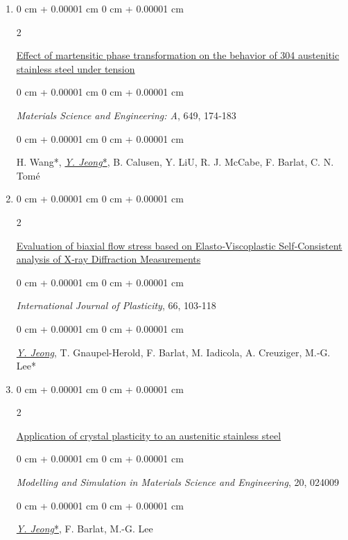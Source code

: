 \documentclass[10pt, letterpaper]{article}
\newenvironment{onecolentry}{
    \begin{adjustwidth}{
        0 cm + 0.00001 cm
    }{
        0 cm + 0.00001 cm
    }
}{
    \end{adjustwidth}
} %
\newenvironment{twocolentry}[2][]{
    \onecolentry
    \def\secondColumn{#2}
    \setcolumnwidth{\fill, 4.5 cm}
    \begin{paracol}{2}
}{
    \switchcolumn \raggedleft \secondColumn
    \end{paracol}
    \endonecolentry
} %
\begin{document}
\begin{enumerate}
        \item
        \begin{twocolentry}{2016}
            \href{http://dx.doi.org/10.1016/j.msea.2015.09.108}{Effect of martensitic phase transformation on the behavior of 304 austenitic stainless steel under tension}
        \end{twocolentry}
        \begin{onecolentry}
            {\it Materials Science and Engineering: A}, 649, 174‑183
        \end{onecolentry}
        \begin{onecolentry}
            H. Wang*, {\underline{\textit{Y. Jeong}*}}, B. Calusen, Y. LiU, R. J. McCabe, F. Barlat, C. N. Tomé
        \end{onecolentry}
        \vspace{0.10 cm}



        \item
        \begin{twocolentry}{2015}
            \href{http://dx.doi.org/10.1016/j.ijplas.2014.06.009}{Evaluation of biaxial flow stress based on Elasto‑Viscoplastic Self‑Consistent analysis of X‑ray Diffraction Measurements}
        \end{twocolentry}
        \begin{onecolentry}
            {\it International Journal of Plasticity}, 66, 103‑118
        \end{onecolentry}
        \begin{onecolentry}
            {\underline{\textit{Y. Jeong}}}, T. Gnaupel-Herold, F. Barlat, M. Iadicola, A. Creuziger, M.‑G. Lee*
        \end{onecolentry}
        \vspace{0.10 cm}

        \item
        \begin{twocolentry}{2012}
            \href{http://dx.doi.org/10.1088/0965-0393/20/2/024009}{Application of crystal plasticity to an austenitic stainless steel }
        \end{twocolentry}
        \begin{onecolentry}
            {\it Modelling and Simulation in Materials Science and Engineering}, 20, 024009
        \end{onecolentry}
        \begin{onecolentry}
            {\underline{\textit{Y. Jeong}*}}, F. Barlat, M.-G. Lee
        \end{onecolentry}
        \vspace{0.10 cm}



\end{enumerate}
\end{document}
